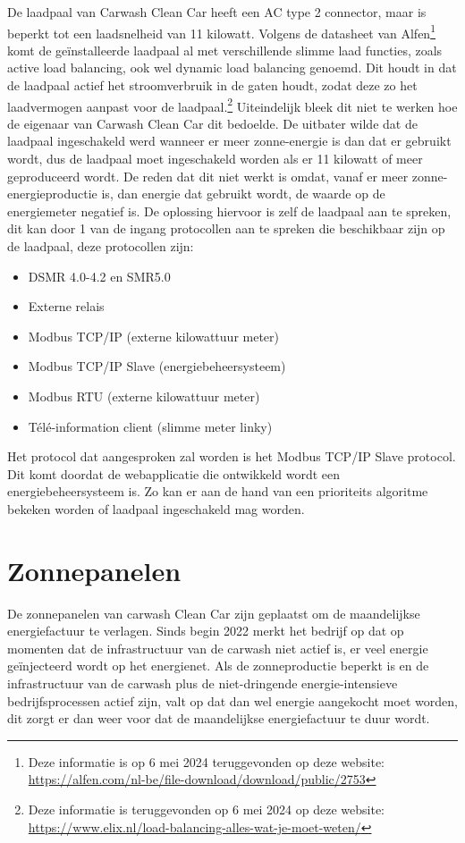 De laadpaal van Carwash Clean Car heeft een AC type 2 connector, maar is beperkt tot een laadsnelheid van 11 kilowatt. Volgens de datasheet van Alfen\footnote{Deze informatie is op 6 mei 2024 teruggevonden op deze website: \url{https://alfen.com/nl-be/file-download/download/public/2753}} komt de geïnstalleerde laadpaal al met verschillende slimme laad functies, zoals active load balancing, ook wel dynamic load balancing genoemd. Dit houdt in dat de laadpaal actief het stroomverbruik in de gaten houdt, zodat deze zo het laadvermogen aanpast voor de laadpaal.\footnote{Deze informatie is teruggevonden op 6 mei 2024 op deze website: \url{https://www.elix.nl/load-balancing-alles-wat-je-moet-weten/}} Uiteindelijk bleek dit niet te werken hoe de eigenaar van Carwash Clean Car dit bedoelde. De uitbater wilde dat de laadpaal ingeschakeld werd wanneer er meer zonne-energie is dan dat er gebruikt wordt, dus de laadpaal moet ingeschakeld worden als er 11 kilowatt of meer geproduceerd wordt. De reden dat dit niet werkt is omdat, vanaf er meer zonne-energieproductie is, dan energie dat gebruikt wordt, de waarde op de energiemeter negatief is. De oplossing hiervoor is zelf de laadpaal aan te spreken, dit kan door 1 van de ingang protocollen aan te spreken die beschikbaar zijn op de laadpaal, deze protocollen zijn:

\begin{itemize}
    \item DSMR 4.0-4.2 en SMR5.0
    \item Externe relais
    \item Modbus TCP/IP (externe kilowattuur meter)
    \item Modbus TCP/IP Slave (energiebeheersysteem)
    \item Modbus RTU (externe kilowattuur meter)
    \item Télé-information client (slimme meter linky)
\end{itemize}

Het protocol dat aangesproken zal worden is het Modbus TCP/IP Slave protocol. Dit komt doordat de webapplicatie die ontwikkeld wordt een energiebeheersysteem is. Zo kan er aan de hand van een prioriteits algoritme bekeken worden of laadpaal ingeschakeld mag worden.

\section{Zonnepanelen}
\label{sec:stand-van-zaken-zonnepanelen}

De zonnepanelen van carwash Clean Car zijn geplaatst om de maandelijkse energiefactuur te verlagen. Sinds begin 2022 merkt het bedrijf op dat op momenten dat de infrastructuur van de carwash niet actief is, er veel energie geïnjecteerd wordt op het energienet. Als de zonneproductie beperkt is en de infrastructuur van de carwash plus de niet-dringende energie-intensieve bedrijfsprocessen actief zijn, valt op dat dan wel energie aangekocht moet worden, dit zorgt er dan weer voor dat de maandelijkse energiefactuur te duur wordt.\\

